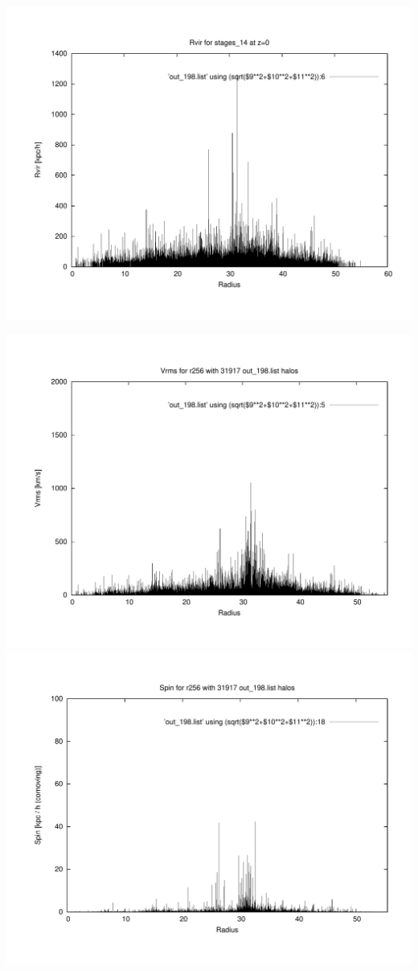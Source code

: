 \includegraphics[scale=0.3]{r256/h100/stages_14/plot_rvir_z0.pdf}

\includegraphics[scale=0.3]{r256/h100/stages_14/plot_Vrms_out_198.pdf}
\includegraphics[scale=0.3]{r256/h100/stages_14/plot_spin_out_198.pdf}

